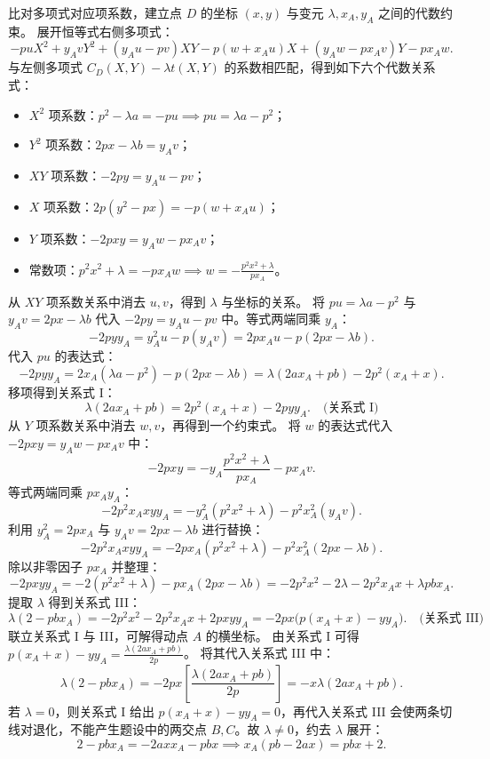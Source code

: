 \begin{solution}
比对多项式对应项系数，建立点 $D$ 的坐标 $(x, y)$ 与变元 $\lambda,x_A,y_A$ 之间的代数约束。
展开恒等式右侧多项式：
\[ -pu X^2 + y_A v Y^2 + (y_A u - pv)XY - p(w + x_A u)X + (y_A w - px_A v)Y - px_A w. \]
与左侧多项式 $C_D(X, Y) - \lambda t(X, Y)$ 的系数相匹配，得到如下六个代数关系式：
\begin{itemize}
\item $X^2$ 项系数：$p^2 - \lambda a = -pu \implies pu = \lambda a - p^2$；
\item $Y^2$ 项系数：$2px - \lambda b = y_A v$；
\item $XY$ 项系数：$-2py = y_A u - pv$；
\item $X$ 项系数：$2p(y^2 - px) = -p(w + x_A u)$；
\item $Y$ 项系数：$-2pxy = y_A w - px_A v$；
\item 常数项：$p^2 x^2 + \lambda = -px_A w \implies w = -\frac{p^2 x^2 + \lambda}{px_A}$。
\end{itemize}
从 $XY$ 项系数关系中消去 $u, v$，得到 $\lambda$ 与坐标的关系。
将 $pu = \lambda a - p^2$ 与 $y_A v = 2px - \lambda b$ 代入 $-2py = y_A u - pv$ 中。等式两端同乘 $y_A$：
\[ -2p y y_A = y_A^2 u - p(y_A v) = 2px_A u - p(2px - \lambda b). \]
代入 $pu$ 的表达式：
\[ -2p y y_A = 2x_A (\lambda a - p^2) - p(2px - \lambda b) = \lambda(2ax_A + pb) - 2p^2(x_A + x). \]
移项得到关系式 I：
\[ \lambda(2ax_A + pb) = 2p^2(x_A + x) - 2py y_A. \quad \text{(关系式 I)} \]
从 $Y$ 项系数关系中消去 $w, v$，再得到一个约束式。
将 $w$ 的表达式代入 $-2pxy = y_A w - px_A v$ 中：
\[ -2pxy = -y_A \frac{p^2 x^2 + \lambda}{px_A} - px_A v. \]
等式两端同乘 $px_A y_A$：
\[ -2p^2 x_A x y y_A = -y_A^2 (p^2 x^2 + \lambda) - p^2 x_A^2 (y_A v). \]
利用 $y_A^2 = 2px_A$ 与 $y_A v = 2px - \lambda b$ 进行替换：
\[ -2p^2 x_A x y y_A = -2px_A (p^2 x^2 + \lambda) - p^2 x_A^2 (2px - \lambda b). \]
除以非零因子 $px_A$ 并整理：
\[ -2pxy y_A = -2(p^2 x^2 + \lambda) - px_A (2px - \lambda b) = -2p^2 x^2 - 2\lambda - 2p^2 x_A x + \lambda pbx_A. \]
提取 $\lambda$ 得到关系式 III：
\[ \lambda(2 - pbx_A) = -2p^2 x^2 - 2p^2 x_A x + 2pxy y_A = -2px\big(p(x_A + x) - yy_A\big). \quad \text{(关系式 III)} \]
联立关系式 I 与 III，可解得动点 $A$ 的横坐标。
由关系式 I 可得 $p(x_A + x) - yy_A = \frac{\lambda(2ax_A + pb)}{2p}$。
将其代入关系式 III 中：
\[ \lambda(2 - pbx_A) = -2px \left[ \frac{\lambda(2ax_A + pb)}{2p} \right] = -x \lambda(2ax_A + pb). \]
若 $\lambda=0$，则关系式 I 给出 $p(x_A+x)-yy_A=0$，再代入关系式 III 会使两条切线对退化，不能产生题设中的两交点 $B,C$。故 $\lambda\neq0$，约去 $\lambda$ 展开：
\[ 2 - pbx_A = -2ax x_A - pbx \implies x_A(pb - 2ax) = pbx + 2. \]

\end{solution}
